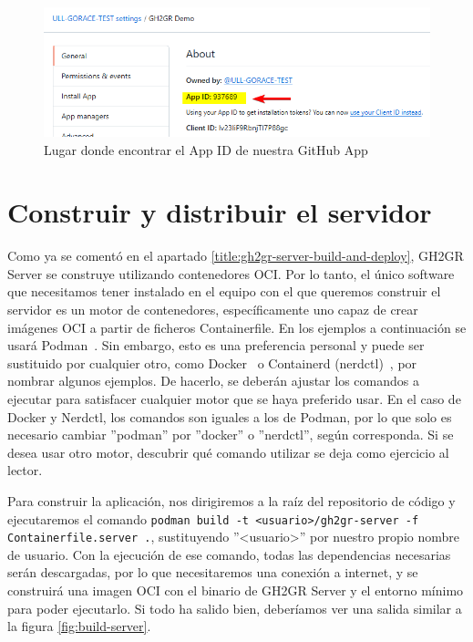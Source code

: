 \begin{figure}
    \centering
    \includegraphics[width=0.75\linewidth]{images/gh-app-id.png}
    \caption{Lugar donde encontrar el App ID de nuestra GitHub App}
    \label{fig:gh-app-id}
\end{figure}

\section{Construir y distribuir el servidor}
Como ya se comentó en el apartado \ref{title:gh2gr-server-build-and-deploy}, GH2GR Server se construye utilizando contenedores \acrshort{OCI}. Por lo tanto, el único software que necesitamos tener instalado en el equipo con el que queremos construir el servidor es un motor de contenedores, específicamente uno capaz de crear imágenes \acrshort{OCI} a partir de ficheros Containerfile. En los ejemplos a continuación se usará Podman~\cite{podmanWhatPodman}. Sin embargo, esto es una preferencia personal y puede ser sustituido por cualquier otro, como Docker~\cite{dockerDockerEngine} o Containerd (nerdctl)~\cite{githubGitHubContainerdnerdctl}, por nombrar algunos ejemplos. De hacerlo, se deberán ajustar los comandos a ejecutar para satisfacer cualquier motor que se haya preferido usar. En el caso de Docker y Nerdctl, los comandos son iguales a los de Podman, por lo que solo es necesario cambiar ''podman'' por ''docker'' o ''nerdctl'', según corresponda. Si se desea usar otro motor, descubrir qué comando utilizar se deja como ejercicio al lector.

\begin{sloppypar}
Para construir la aplicación, nos dirigiremos a la raíz del repositorio de código y ejecutaremos el comando \texttt{podman build -t <usuario>/gh2gr-server -f Containerfile.server .}, sustituyendo ''<usuario>'' por nuestro propio nombre de usuario. Con la ejecución de ese comando, todas las dependencias necesarias serán descargadas, por lo que necesitaremos una conexión a internet, y se construirá una imagen \acrshort{OCI} con el binario de GH2GR Server y el entorno mínimo para poder ejecutarlo. Si todo ha salido bien, deberíamos ver una salida similar a la figura \ref{fig:build-server}.
\end{sloppypar}

